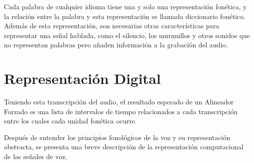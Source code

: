 Cada palabra de cualquier idioma tiene una y solo una representación fonética, y la relación entre la palabra y esta representación es llamada diccionario fonético. Además de esta representación, son necesarias otras características para representar una señal hablada, como el silencio, los murmullos y otros sonidos que no representan palabras pero añaden información a la grabación del audio.

\section{Representación Digital}

Teniendo esta transcripción del audio, el resultado esperado de un Alineador Forzado es una lista de intervalos de tiempo relacionados a cada transcripción entre los cuales cada unidad fonética ocurre.

Después de entender los principios fonológicos de la voz y su representación abstracta, se presenta una breve descripción de la representación computacional de las señales de voz.

